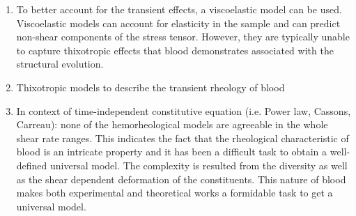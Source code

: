 \documentclass[11pt,letterpaper]{article}
\begin{document}
\begin{enumerate}
\item To better account for
the transient effects, a viscoelastic model can be used. 
Viscoelastic models can account for elasticity in the sample
and can predict non-shear components of the stress tensor. However, they are typically unable to capture thixotropic effects that
blood demonstrates associated with the structural evolution.
\item Thixotropic models to
describe the transient rheology of blood
\item In context of time-independent constitutive equation (i.e. Power law, Cassons, Carreau): none of the hemorheological models are agreeable in the whole shear rate ranges. This indicates the fact that the rheological characteristic of blood is an intricate property and it has been a difficult task to obtain a well-defined universal model. The complexity is resulted from the diversity as well as the shear dependent deformation of the constituents. This nature of blood makes both experimental and theoretical works a formidable task to get a universal model.
\end{enumerate}


\newpage
\end{document}
